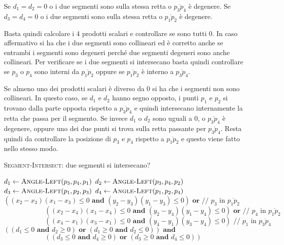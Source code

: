 Se $d_1 = d_2 = 0$ o i due segmenti sono sulla stessa retta o $\overline{p_3p_4}$ è degenere. 
Se $d_3=d_4=0$ o i due segmenti sono sulla stessa retta o $\overline{p_1p_2}$ è degenere.

Basta quindi calcolare i 4 prodotti scalari e controllare se sono tutti 0. In caso affermativo si ha che i due segmenti sono collineari ed è corretto anche se entrambi i segmenti sono degeneri perché due segmenti degeneri sono anche collineari. Per verificare se i due segmenti si intersecano basta quindi controllare se $p_3$ o $p_4$ sono interni da $\overline{p_1p_2}$ oppure se $\overline{p_1p_2}$ è interno a $\overline{p_3p_4}$.

Se almeno uno dei prodotti scalari è diverso da $0$ si ha che i segmenti non sono collineari. In questo caso, se $d_1$ e $d_2$ hanno segno opposto, i punti $p_1$ e $p_2$ si trovano dalla parte opposta rispetto a $\overline{p_3p_4}$ e quindi intersecano internamente la retta che passa per il segmento. Se invece $d_1$ o $d_2$ sono uguali a 0, o $\overline{p_3p_4}$ è degenere, oppure uno dei due punti si trova sulla retta passante per $\overline{p_3p_4}$.
Resta quindi da controllare la posizione di $p_3$ e $p_4$ rispetto a $\overline{p_1p_2}$ e questo viene fatto nello stesso modo.

\begin{breakablealgorithm}
	\caption{\textsc{Segment-Intersect}: due segmenti si intersecano?}
	\begin{algorithmic}[1]
		    \State $d_1 \gets \textsc{Angle-Left}(p_3,p_4,p_1)$
		    \State $d_2 \gets \textsc{Angle-Left}(p_3,p_4,p_2)$
		    \State $d_3 \gets \textsc{Angle-Left}(p_1,p_2,p_3)$
		    \State $d_4 \gets \textsc{Angle-Left}(p_1,p_2,p_4)$
		     
		        \State \Return $((x_2 - x_3)(x_1 - x_3) \leq 0 \textbf{ and } (y_2 - y_3)(y_1 - y_3) \leq 0) \textbf{ or } \text{// }p_3 \text{ in } \overline{p_1p_2}$
		        \Statex $\qquad \qquad \qquad((x_2 - x_4)(x_1 - x_4) \leq 0 \textbf{ and } (y_2 - y_4)(y_1 - y_4)\leq 0) \textbf{ or } \text{// }p_4 \text{ in } \overline{p_1p_2}$
		        \Statex $\qquad \qquad \qquad ((x_4 - x_1)(x_3 - x_1) \leq 0 \textbf{ and } (y_4 - y_1)(y_3 - y_4)\leq 0) \text{ // }p_1 \text{ in } \overline{p_3p_4} $
		    \Else
				\State \Return $((d_1 \leq 0 \textbf{ and } d_2 \geq 0)\textbf{ or }(d_1 \geq 0\textbf{ and }d_2 \leq 0))\textbf{ and }$
		        \Statex $ \qquad \qquad \qquad((d_3 \leq 0 \textbf{ and } d_4 \geq 0)\textbf{ or } (d_3 \geq 0 \textbf{ and }d_4 \leq 0)) $
		    \EndIf
		\EndFunction
       	\end{algorithmic}
\end{breakablealgorithm}

